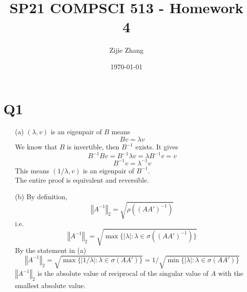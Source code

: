 \documentclass{article}
\title{SP21 COMPSCI 513 - Homework 4}
\author{Zijie Zhang}
\date\today
\begin{document}
\maketitle
\section*{Q1}
    \begin{itemize}
        \item[(a)]
        $(\lambda, v)$ is an eigenpair of $B$ means
        $$Bv = \lambda v$$
        We know that $B$ is invertible, then $B^{-1}$ exists. It gives
        $$B^{-1}Bv = B^{-1}\lambda v = \lambda B^{-1}v = v$$
        $$B^{-1}v =\lambda^{-1} v$$
        This means $(1/\lambda, v)$ is an eigenpair of $B^{-1}$.\\
        The entire proof is equivalent and reversible.
        \item[(b)]
        By definition, $$\left\Vert A^{-1} \right\Vert_2 = \sqrt{\rho((AA')^{-1})}$$
        i.e. $$\left\Vert A^{-1} \right\Vert_2 = \sqrt{\max{\{|\lambda|:\lambda\in\sigma((AA')^{-1}) \}} } $$
        By the statement in (a)
        $$\left\Vert A^{-1} \right\Vert_2 = \sqrt{\max{\{|1/\lambda|:\lambda\in\sigma(AA') \}} } = 1/\sqrt{\min{\{|\lambda|:\lambda\in\sigma(AA') \}} } $$
        $\left\Vert A^{-1} \right\Vert_2$ is the absolute value of reciprocal of the singular value of $A$ with the smallest absolute value.
    \end{itemize}
\end{document}
